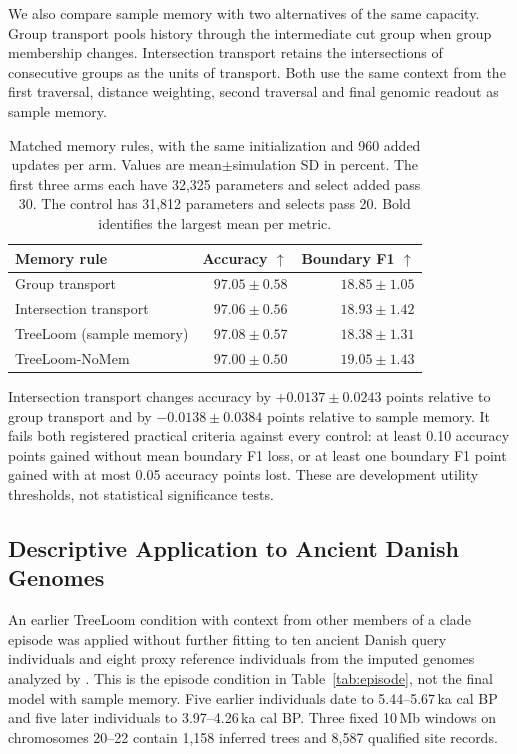 \documentclass[letterpaper]{article}
\newcommand{\best}[1]{\mathbf{#1}}
\begin{document}
We also compare sample memory with two alternatives of the same capacity. Group transport pools history through the intermediate cut group when group membership changes. Intersection transport retains the intersections of consecutive groups as the units of transport. Both use the same context from the first traversal, distance weighting, second traversal and final genomic readout as sample memory.

\begin{table}[t]
\centering
\small
\begin{tabular}{@{}lrr@{}}
\toprule
Memory rule & Accuracy $\uparrow$ & Boundary F1 $\uparrow$\\
\midrule
Group transport &$97.05\pm0.58$&$18.85\pm1.05$\\
Intersection transport &$97.06\pm0.56$&$18.93\pm1.42$\\
TreeLoom (sample memory) &$\best{97.08\pm0.57}$&$18.38\pm1.31$\\
TreeLoom-NoMem &$97.00\pm0.50$&$\best{19.05\pm1.43}$\\
\bottomrule
\end{tabular}
\caption{Matched memory rules, with the same initialization and 960 added updates per arm. Values are mean$\pm$simulation SD in percent. The first three arms each have 32,325 parameters and select added pass 30. The control has 31,812 parameters and selects pass 20. Bold identifies the largest mean per metric.}
\label{tab:memoryrules}
\end{table}

Intersection transport changes accuracy by $+0.0137\pm0.0243$ points relative to group transport and by $-0.0138\pm0.0384$ points relative to sample memory. It fails both registered practical criteria against every control: at least 0.10 accuracy points gained without mean boundary F1 loss, or at least one boundary F1 point gained with at most 0.05 accuracy points lost. These are development utility thresholds, not statistical significance tests.

\subsection{Descriptive Application to Ancient Danish Genomes}
An earlier TreeLoom condition with context from other members of a clade episode was applied without further fitting to ten ancient Danish query individuals and eight proxy reference individuals from the imputed genomes analyzed by \citet{eurasians2024}. This is the episode condition in Table~\ref{tab:episode}, not the final model with sample memory. Five earlier individuals date to 5.44--5.67\,ka cal BP and five later individuals to 3.97--4.26\,ka cal BP. Three fixed 10\,Mb windows on chromosomes 20--22 contain 1,158 inferred trees and 8,587 qualified site records.
\end{document}
